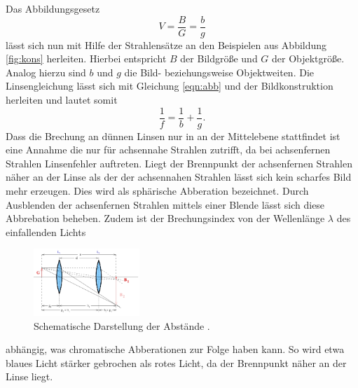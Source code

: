 Das Abbildungsgesetz
\begin{equation}
  V = \frac{B}{G} = \frac{b}{g}
  \label{eqn:abb}
\end{equation}
lässt sich nun mit Hilfe der Strahlensätze an den Beispielen aus Abbildung \ref{fig:kons}
herleiten. Hierbei entspricht $B$ der Bildgröße und $G$ der Objektgröße. Analog
hierzu sind $b$ und $g$ die Bild- beziehungsweise Objektweiten. Die Linsengleichung
lässt sich mit Gleichung \eqref{eqn:abb} und der Bildkonstruktion herleiten und
lautet somit
\begin{equation}
  \frac{1}{f}=\frac{1}{b}+\frac{1}{g}.
  \label{eqn:linse}
\end{equation}
Dass die Brechung an dünnen Linsen nur in an der Mittelebene stattfindet ist eine
Annahme die nur für achsennahe Strahlen zutrifft, da bei achsenfernen Strahlen
Linsenfehler auftreten. Liegt der Brennpunkt der achsenfernen Strahlen näher an
der Linse als der der achsennahen Strahlen lässt sich kein scharfes Bild mehr erzeugen.
Dies wird als sphärische Abberation bezeichnet. Durch Ausblenden der
achsenfernen Strahlen mittels einer Blende lässt sich diese Abbrebation beheben.
Zudem ist der Brechungsindex von der Wellenlänge $\lambda$ des einfallenden Lichts
\begin{figure}
  \includegraphics[width=4cm]{bilder/abstande.jpg}
  \caption{Schematische Darstellung der Abstände \cite{408}.}
  \label{fig:abs}
\end{figure}
abhängig, was chromatische Abberationen zur Folge haben kann.
So wird etwa blaues Licht stärker gebrochen als rotes Licht, da der Brennpunkt
näher an der Linse liegt.

